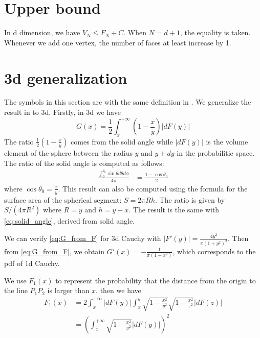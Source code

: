 \documentclass{article}
\begin{document}
\section{Upper bound}
In d dimension, we have
$V_N \leq F_N   + C$.
When $N=d+1$, the equality is taken.
Whenever we add one vertex, the number of faces
at least increase by 1.

\section{3d generalization}
The symbols in this section are with the same definition in \cite{carnal1970konvexe}.
We generalize the result in \cite{carnal1970konvexe} to 3d.
Firstly, in 3d we have
\begin{equation}\label{eq:G_from_F}
    G(x) = \frac{1}{2} \int_x^{+\infty} (1-\frac{x}{y}) |dF(y)|
\end{equation}
The ratio $\frac{1}{2} (1-\frac{x}{y})$
comes from the solid angle while $|dF(y)|$
is the volume element of the sphere between the radius
$y$ and $y+dy$ in the probabilitic space.
The ratio of the solid angle is computed as follows:
\begin{align}\label{eq:solid_angle}
    \frac{\int_0^{\theta_0} \sin\theta d\theta d\phi}
    {4\pi} & = \frac{1-\cos \theta_0}{2}
\end{align} 
where $\cos\theta_0=\frac{x}{y}$.
This result can also be computed
using the formula for the surface area of
the spherical segment: $S=2\pi R h$. The ratio is given by
$S/(4\pi R^2)$ where $R=y$ and $h=y-x$. The result is the same
with \eqref{eq:solid_angle},
derived from solid angle.

We can verify \eqref{eq:G_from_F} for 3d Cauchy with
$|F'(y)|=\frac{4y^2}{\pi(1+y^2)^2}$.
Then from \eqref{eq:G_from_F}, 
we obtain $G'(x)=-\frac{1}{\pi (1+x^2)}$, which corresponds to
the pdf of 1d Cauchy.

We use $F_1(x)$ to represent the probability that
the distance from the origin to the line $P_1P_2$
is larger than $x$.
then we have
\begin{align}
    F_1(x) & = 2 \int_x^{+\infty} |dF(y)|
    \int_x^y  \sqrt{1-\frac{x^2}{y^2}} \sqrt{1-\frac{x^2}{z^2}}
    |dF(z)| \\
    & = \left(\int_x^{+\infty} \sqrt{1-\frac{x^2}{y^2}}
    |d F(y)| \right)^2
    \label{eq:form_F_1_x}
\end{align}
\end{document}

